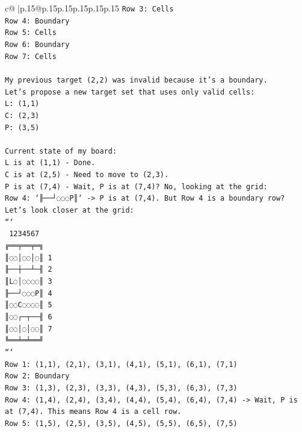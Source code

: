 \documentclass{article}
\begin{document}
{\begin{supertabular}{c@{$\;$}|p{.15\linewidth}@{}p{.15\linewidth}p{.15\linewidth}p{.15\linewidth}p{.15\linewidth}p{.15\linewidth}}
{{{\texttt{Row 3: Cells} \\
\texttt{Row 4: Boundary} \\
\texttt{Row 5: Cells} \\
\texttt{Row 6: Boundary} \\
\texttt{Row 7: Cells} \\
\\ 
\texttt{My previous target (2,2) was invalid because it's a boundary.} \\
\texttt{Let's propose a new target set that uses only valid cells:} \\
\texttt{L: (1,1)} \\
\texttt{C: (2,3)} \\
\texttt{P: (3,5)} \\
\\ 
\texttt{Current state of my board:} \\
\texttt{L is at (1,1) {-} Done.} \\
\texttt{C is at (2,5) {-} Need to move to (2,3).} \\
\texttt{P is at (7,4) {-} Wait, P is at (7,4)? No, looking at the grid:} \\
\texttt{Row 4: `╟──┘◌◌◌P║` {-}> P is at (7,4). But Row 4 is a boundary row?} \\
\texttt{Let's look closer at the grid:} \\
\texttt{```} \\
\texttt{ 1234567} \\
\texttt{╔══╤══╤═╗} \\
\texttt{║◌◌│◌◌│◌║ 1} \\
\texttt{╟──┼──┴─╢ 2} \\
\texttt{║L◌│◌◌◌◌║ 3} \\
\texttt{╟──┘◌◌◌P║ 4} \\
\texttt{║◌◌C◌◌◌◌║ 5} \\
\texttt{║◌◌┌─┬──╢ 6} \\
\texttt{║◌◌│◌│◌◌║ 7} \\
\texttt{╚══╧═╧══╝} \\
\texttt{```} \\
\texttt{Row 1: (1,1), (2,1), (3,1), (4,1), (5,1), (6,1), (7,1)} \\
\texttt{Row 2: Boundary} \\
\texttt{Row 3: (1,3), (2,3), (3,3), (4,3), (5,3), (6,3), (7,3)} \\
\texttt{Row 4: (1,4), (2,4), (3,4), (4,4), (5,4), (6,4), (7,4) {-}> Wait, P is at (7,4). This means Row 4 is a cell row.} \\
\texttt{Row 5: (1,5), (2,5), (3,5), (4,5), (5,5), (6,5), (7,5)} \\
}}}
\end{supertabular}}
\end{document}
